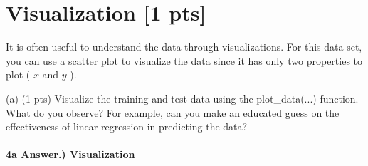 \documentclass[10pt]{article}
\begin{document}
\section*{Visualization [1 pts]}
It is often useful to understand the data through visualizations. For this data set, you can use a scatter plot to visualize the data since it has only two properties to plot ( $x$ and $y$ ).

(a) (1 pts) Visualize the training and test data using the plot\_data(...) function. What do you observe? For example, can you make an educated guess on the effectiveness of linear regression in predicting the data?

\paragraph{4a Answer.) Visualization}
\hspace{1cm}
\end{document}
